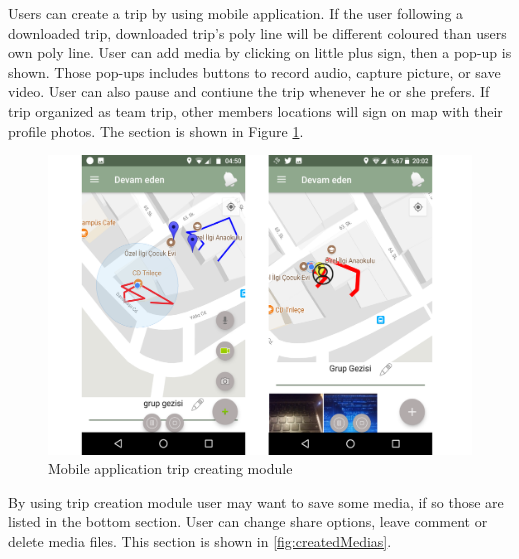 \newpage

Users can create a trip by using mobile application. If the user following a downloaded trip, downloaded trip's poly line will be different coloured than users own poly line. User can add media by clicking on little plus sign, then a pop-up is shown. Those pop-ups includes buttons to record audio, capture picture, or save video. User can also pause and contiune the trip whenever he or she prefers. If trip organized as team trip, other members locations will sign on map with their profile photos. The section is shown in Figure \ref{fig:tripCreateSection}.

\begin{figure}[!htbp]
\centering
\includegraphics[width=\textwidth]{projectChapters/images/tripCreateSection.png}
\caption{Mobile application trip creating module}
\label{fig:tripCreateSection}
\end{figure}

\newpage

By using trip creation module user may want to save some media, if so those are listed in the bottom section. User can change share options, leave comment or delete media files. This section is shown in \ref{fig:createdMedias}.

